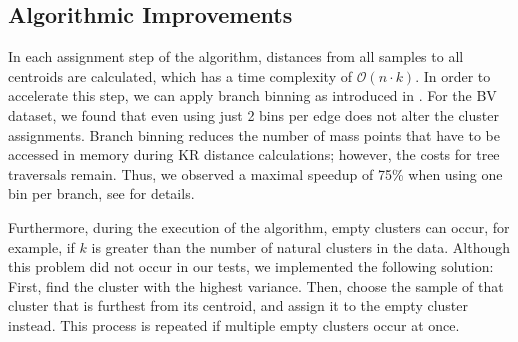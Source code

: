 
\subsection{Algorithmic Improvements}
\label{ch:Clustering:sec:PhylogeneticKmeans:sub:AlgorithmicImprovements}

In each assignment step of the algorithm, distances from all samples to all centroids are calculated,
which has a time complexity of $\mathcal{O}(n \cdot k)$.
In order to accelerate this step, we can apply branch binning as introduced in .
For the \ac{BV} dataset, we found that even using just \num{2} bins per edge does not alter the cluster assignments.
Branch binning reduces the number of mass points that have to be accessed in memory during KR distance calculations;
however, the costs for tree traversals remain.
Thus, we observed a maximal speedup of 75\% when using one bin per branch,
see  for details.

Furthermore, during the execution of the algorithm, empty clusters can occur,
for example, if $k$ is greater than the number of natural clusters in the data.
Although this problem did not occur in our tests, we implemented the following solution:
First, find the cluster with the highest variance.
Then, choose the sample of that cluster that is furthest from its centroid,
and assign it to the empty cluster instead.
This process is repeated if multiple empty clusters occur at once.


